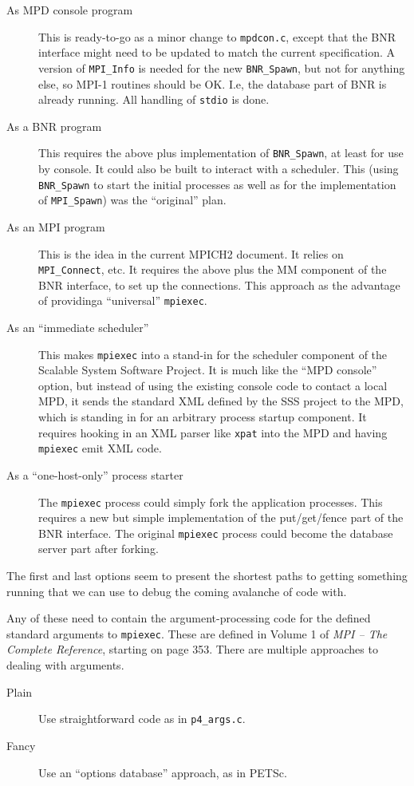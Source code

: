 \documentclass{article}
\def\code#1{\texttt{#1}}
\let\file=\code
\begin{document}
\begin{description}
\item[As MPD console program] This is ready-to-go as a minor change to
  \file{mpdcon.c}, except that the BNR interface might need to be updated to match
  the current specification.  A version of \code{MPI_Info} is needed for the new
  \code{BNR_Spawn}, but not for anything else, so MPI-1 routines should be OK.  I.e,
  the database part of BNR is already running.  All handling of \code{stdio}
  is done.
\item[As a BNR program] This requires the above plus implementation of
  \code{BNR_Spawn}, at least for use by console.  It could also be built to interact
  with a scheduler.  This (using \code{BNR_Spawn} to start the initial processes as
  well as for the implementation of \code{MPI_Spawn}) was the ``original''
  plan.
\item[As an MPI program] This is the idea in the current MPICH2 document.  It
  relies on \code{MPI_Connect}, etc.  It requires the above plus the MM component
  of the BNR interface, to set up the connections.  This approach as the
  advantage of providinga ``universal'' \code{mpiexec}. 
\item[As an ``immediate scheduler''] This makes \code{mpiexec} into a stand-in
  for the scheduler component of the Scalable System Software Project.  It is
  much like the ``MPD console'' option, but instead of using the existing
  console code to contact a local MPD, it sends the standard XML defined by
  the SSS project to the MPD, which is standing in for an arbitrary process
  startup component.  It requires hooking in an XML parser like \code{xpat}
  into the MPD and having \code{mpiexec} emit XML code.
\item[As a ``one-host-only'' process starter] The \code{mpiexec} process could
  simply fork the application processes.  This requires a new but simple
  implementation of the put/get/fence part of the BNR interface.  The original
  \code{mpiexec} process could become the database server part after forking.
\end{description}

The first and last options seem to present the shortest paths to getting
something running that we can use to debug the coming avalanche of code with.

Any of these need to contain the argument-processing code for the defined
standard arguments to \code{mpiexec}.  These are defined in Volume 1 of {\em
  MPI -- The Complete Reference}, starting on page 353.  There are multiple
approaches to dealing with arguments.
\begin{description}
\item[Plain] Use straightforward code as in \file{p4_args.c}.
\item[Fancy] Use an ``options database'' approach, as in PETSc.
\end{description}
\end{document}

